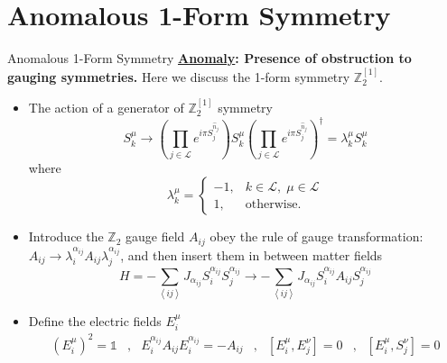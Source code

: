 \documentclass[professionalfont]{beamer}
\newcommand{\anglelr}[1]{\left\langle #1 \right\rangle}
\newcommand{\lr}[1]{\left(#1\right)}
\newcommand{\tinyeq}[1]{{\tiny\[#1\]}}
\begin{document}
\section{Anomalous 1-Form Symmetry}
\begin{frame}{Anomalous 1-Form Symmetry}
    \textbf{\underline{Anomaly}: Presence of obstruction to gauging symmetries.} Here we discuss the 1-form symmetry $\mathbb{Z}_2^{[1]}$.
    \begin{itemize}
        \item The action of a generator of $\mathbb{Z}^{[1]}_2$ symmetry 
        \tinyeq{
            S^\mu_k \to \lr{\prod_{j\in\mathcal{L}}e^{i\pi S^{\hat{n}_j}_j}} S^\mu_k \lr{\prod_{j\in\mathcal{L}}e^{i\pi S^{\hat{n}_j}_j}}^\dagger = \lambda^\mu_kS^\mu_k
        }
        where
        \tinyeq{
            \lambda^\mu_k = 
            \begin{cases}
                -1, & k\in\mathcal{L} ,\;\mu\in\mathcal{L} \\
                1 , & \text{otherwise.}
            \end{cases}
        }
        \item Introduce the $\mathbb{Z}_2$ gauge field $A_{ij}$ obey the rule of  gauge transformation: $A_{ij} \to \lambda_i^{\alpha_{ij}} A_{ij} \lambda^{\alpha_{ij}}_j$, and then insert them in between matter fields
        \tinyeq{
             H = -\sum_{\anglelr{ij}}J_{\alpha_{ij}}S^{\alpha_{ij}}_iS^{\alpha_{ij}}_j \to -\sum_{\anglelr{ij}}J_{\alpha_{ij}}S^{\alpha_{ij}}_i A_{ij} S^{\alpha_{ij}}_j
        }
        \item Define the electric fields $E_i^\mu$
        \tinyeq{
            \begin{array}{ccccccc}
                \lr{E_i^\mu}^2=\mathds{1} &,& E_i^{\alpha_{ij}} A_{ij} E_i^{\alpha_{ij}} = - A_{ij} &,& [E_i^\mu, E^\nu_j] = 0 &,& [E_i^\mu, S^\nu_j] = 0
            \end{array}
        }
        
    \end{itemize}
\end{frame}
\end{document}
